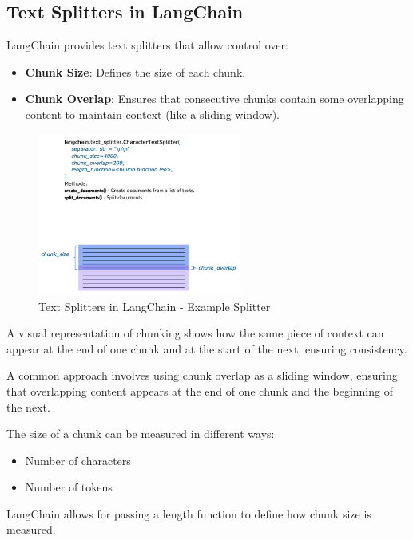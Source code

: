 \documentclass{article}
\begin{document}
\subsection{Text Splitters in LangChain}

LangChain provides text splitters that allow control over:

\begin{itemize}
    \item \textbf{Chunk Size}: Defines the size of each chunk.
    \item \textbf{Chunk Overlap}: Ensures that consecutive chunks contain some overlapping content to maintain context (like a sliding window).
\end{itemize}

\begin{figure}[H]
    \centering
    \includegraphics[width=0.6\textwidth]{images/langchain_chat_with_your_data_006.png}
    \caption{Text Splitters in LangChain - Example Splitter}
    \label{fig:text_splitters_in_langchain_example_splitter}
\end{figure}

A visual representation of chunking shows how the same piece of context can appear at the end of one chunk and at the start of the next, ensuring consistency.

A common approach involves using chunk overlap as a sliding window, ensuring that overlapping content appears at the end of one chunk and the beginning of the next.

The size of a chunk can be measured in different ways:
\begin{itemize}
    \item Number of characters
    \item Number of tokens
\end{itemize}

LangChain allows for passing a length function to define how chunk size is measured.
\end{document}
